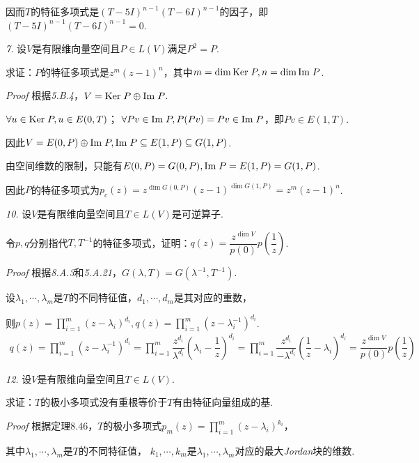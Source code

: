 因而\(T\)的特征多项式是\((T-5I)^{n-1}(T-6I)^{n-1}\)的因子，即\((T-5I)^{n-1}(T-6I)^{n-1}=0\).

\hspace*{\fill}

\textit{7.}
设\(V\)是有限维向量空间且\(P \in L(V)\)满足\(P^2=P\).

求证：\(P\)的特征多项式是\(z^m(z-1)^n\)，其中\(m=\dim \mathrm{Ker \;} P,n=\dim \mathrm{Im \;} P\).

\textit{Proof}
根据\textit{5.B.4}，\(V=\mathrm{Ker \;} P \oplus \mathrm{Im \;} P\).

\(\forall u \in \mathrm{Ker \;} P,u \in E(0,T)\)；
\(\forall Pv \in \mathrm{Im \;} P,P(Pv)=Pv \in \mathrm{Im \;} P\)，即\(Pv \in E(1,T)\).

因此\(V=E(0,P) \oplus \mathrm{Im \;} P,\mathrm{Im \;} P \subseteq E(1,P) \subseteq G(1,P)\).

由空间维数的限制，只能有\(E(0,P)=G(0,P),\mathrm{Im \;} P=E(1,P)=G(1,P)\).

因此\(P\)的特征多项式为\(p_c(z)=z^{\dim G(0,P)}(z-1)^{\dim G(1,P)}=z^m(z-1)^n\).

\newpage

\textit{10.}
设\(V\)是有限维向量空间且\(T \in L(V)\)是可逆算子.

令\(p,q\)分别指代\(T,T^{-1}\)的特征多项式，证明：\(q(z)=\dfrac{z^{\dim V}}{p(0)}p(\dfrac{1}{z})\).

\textit{Proof}
根据\textit{8.A.3}和\textit{5.A.21}，\(G(\lambda,T)=G(\lambda^{-1},T^{-1})\).

设\(\lambda_1,\cdots,\lambda_m\)是\(T\)的不同特征值，\(d_1,\cdots,d_m\)是其对应的重数，

则\(p(z)=\prod_{i=1}^m (z-\lambda_i)^{d_i},q(z)=\prod_{i=1}^m (z-\lambda_i^{-1})^{d_i}\).
    \begin{align*}
        q(z)=\prod_{i=1}^m (z-\lambda_i^{-1})^{d_i}
            =\prod_{i=1}^m \dfrac{z^{d_i}}{\lambda^{d_i}}(\lambda_i-\dfrac{1}{z})^{d_i}
            =\prod_{i=1}^m \dfrac{z^{d_i}}{-\lambda^{d_i}}(\dfrac{1}{z}-\lambda_i)^{d_i}
            =\dfrac{z^{\dim V}}{p(0)}p(\dfrac{1}{z})
    \end{align*}

\hspace*{\fill}

\textit{12.}
设\(V\)是有限维向量空间且\(T \in L(V)\).

求证：\(T\)的极小多项式没有重根等价于\(T\)有由特征向量组成的基.

\textit{Proof}
根据定理8.46，\(T\)的极小多项式\(p_m(z)=\prod_{i=1}^m (z-\lambda_i)^{k_i}\)，

其中\(\lambda_1,\cdots,\lambda_m\)是\(T\)的不同特征值，
\(k_1,\cdots,k_m\)是\(\lambda_1,\cdots,\lambda_m\)对应的最大\textit{Jordan}块的维数.

